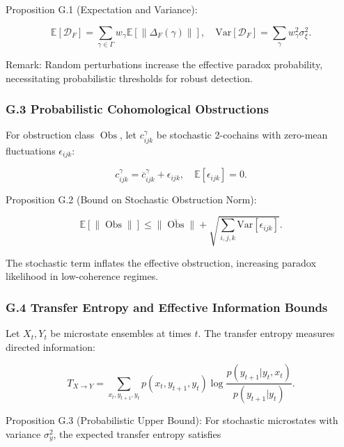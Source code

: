 \documentclass[12pt]{article}
\theoremstyle{plain}
\begin{document}
Proposition G.1 (Expectation and Variance):

\begin{equation}
\mathbb{E}[\mathcal{D}_F] = \sum_{\gamma \in \Gamma} w_\gamma \mathbb{E}[\|\Delta_F(\gamma)\|], \quad \mathrm{Var}[\mathcal{D}_F] = \sum_\gamma w_\gamma^2 \sigma_\xi^2.
\end{equation}

Remark: Random perturbations increase the effective paradox probability, necessitating probabilistic thresholds for robust detection.

\subsubsection*{G.3 Probabilistic Cohomological Obstructions}

For obstruction class \(\operatorname{Obs}\), let \(c_{ijk}^\gamma\) be stochastic 2-cochains with zero-mean fluctuations \(\epsilon_{ijk}\):

\begin{equation}
c_{ijk}^\gamma = \overline{c}_{ijk}^\gamma + \epsilon_{ijk}, \quad \mathbb{E}[\epsilon_{ijk}] = 0.
\end{equation}

Proposition G.2 (Bound on Stochastic Obstruction Norm):

\begin{equation}
\mathbb{E}[\|\operatorname{Obs}\|] \le \|\overline{\operatorname{Obs}}\| + \sqrt{\sum_{i,j,k} \mathrm{Var}[\epsilon_{ijk}]}.
\end{equation}

The stochastic term inflates the effective obstruction, increasing paradox likelihood in low-coherence regimes.

\subsubsection*{G.4 Transfer Entropy and Effective Information Bounds}

Let \(X_t, Y_t\) be microstate ensembles at times \(t\). The transfer entropy measures directed information:

\begin{equation}
T_{X \to Y} = \sum_{x_t, y_{t+1}, y_t} p(x_t, y_{t+1}, y_t) \log \frac{p(y_{t+1}|y_t, x_t)}{p(y_{t+1}|y_t)}.
\end{equation}

Proposition G.3 (Probabilistic Upper Bound): For stochastic microstates with variance \(\sigma_y^2\), the expected transfer entropy satisfies
\end{document}
